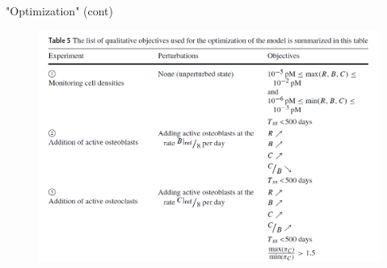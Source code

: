 \documentclass{beamer}
\begin{document}
\begin{frame}{"Optimization" (cont)}
	\begin{figure}[h]
		\centering
			\includegraphics[scale=0.45]{../Figures/fig_lemaire_table5.png}
	\end{figure}	
\end{frame}
\end{document}
